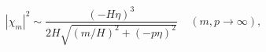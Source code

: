 \begin{equation}
|\chi_{m}|^{2} \sim \frac{(- H \eta)^{3}}{2 H \sqrt{(m/H)^{2} + (- p \eta)^{2}}}
\;\;\;\; (m,p \rightarrow \infty),
\end{equation}

